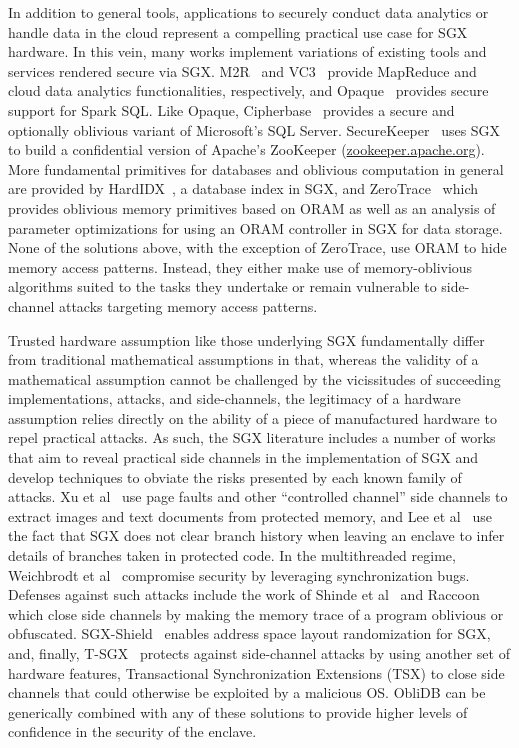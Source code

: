 \documentclass[letterpaper,twocolumn,10pt]{article}
\def\name/{ObliDB}
\begin{document}
In addition to general tools, applications to securely conduct data analytics or handle data in the cloud represent a compelling practical use case for SGX hardware. In this vein, many works implement variations of existing tools and services rendered secure via SGX. M2R~\cite{DSC+15} and VC3~\cite{SCF+15} provide MapReduce and cloud data analytics functionalities, respectively, and Opaque~\cite{ZDB+17} provides secure support for Spark SQL. Like Opaque, Cipherbase~\cite{cipherbase} provides a secure and optionally oblivious variant of Microsoft's SQL Server. SecureKeeper~\cite{BWG+16} uses SGX to build a confidential version of Apache's ZooKeeper (\url{zookeeper.apache.org}). More fundamental primitives for databases and oblivious computation in general are provided by HardIDX~\cite{FBB+17}, a database index in SGX, and ZeroTrace~\cite{SGF17} which provides oblivious memory primitives based on ORAM as well as an analysis of parameter optimizations for using an ORAM controller in SGX for data storage. None of the solutions above, with the exception of ZeroTrace, use ORAM to hide memory access patterns. Instead, they either make use of memory-oblivious algorithms suited to the tasks they undertake or remain vulnerable to side-channel attacks targeting memory access patterns.

Trusted hardware assumption like those underlying SGX fundamentally differ from traditional mathematical assumptions in that, whereas the validity of a mathematical assumption cannot be challenged by the vicissitudes of succeeding implementations, attacks, and side-channels, the legitimacy of a hardware assumption relies directly on the ability of a piece of manufactured hardware to repel practical attacks. As such, the SGX literature includes a number of works that aim to reveal practical side channels in the implementation of SGX and develop techniques to obviate the risks presented by each known family of attacks. Xu et al~\cite{XCP15} use page faults and other ``controlled channel'' side channels to extract images and text documents from protected memory, and Lee et al~\cite{LSG+16} use the fact that SGX does not clear branch history when leaving an enclave to infer details of branches taken in protected code. In the multithreaded regime, Weichbrodt et al~\cite{WKPK16} compromise security by leveraging synchronization bugs. Defenses against such attacks include the work of Shinde et al~\cite{SCNS16} and Raccoon~\cite{RLT15} which close side channels by making the memory trace of a program oblivious or obfuscated. SGX-Shield~\cite{SLK+17} enables address space layout randomization for SGX, and, finally, T-SGX~\cite{SLKP17} protects against side-channel attacks by using another set of hardware features, Transactional Synchronization Extensions (TSX) to close side channels that could otherwise be exploited by a malicious OS. \name/ can be generically combined with any of these solutions to provide higher levels of confidence in the security of the enclave.
\end{document}
